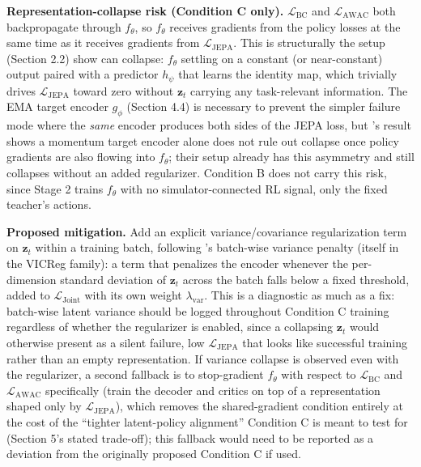 \documentclass[11pt]{article}
\begin{document}
\textbf{Representation-collapse risk (Condition C only).} \(\mathcal{L}_{\text{BC}}\) and \(\mathcal{L}_{\text{AWAC}}\) both backpropagate through \(f_\theta\), so \(f_\theta\) receives gradients from the policy losses at the same time as it receives gradients from \(\mathcal{L}_{\text{JEPA}}\). This is structurally the setup \citet{kenneweg2025jeparl} (Section 2.2) show can collapse: \(f_\theta\) settling on a constant (or near-constant) output paired with a predictor \(h_\psi\) that learns the identity map, which trivially drives \(\mathcal{L}_{\text{JEPA}}\) toward zero without \(\mathbf{z}_t\) carrying any task-relevant information. The EMA target encoder \(g_\phi\) (Section 4.4) is necessary to prevent the simpler failure mode where the \emph{same} encoder produces both sides of the JEPA loss, but \citeauthor{kenneweg2025jeparl}'s result shows a momentum target encoder alone does not rule out collapse once policy gradients are also flowing into \(f_\theta\); their setup already has this asymmetry and still collapses without an added regularizer. Condition B does not carry this risk, since Stage 2 trains \(f_\theta\) with no simulator-connected RL signal, only the fixed teacher's actions.

\textbf{Proposed mitigation.} Add an explicit variance/covariance regularization term on \(\mathbf{z}_t\) within a training batch, following \citeauthor{kenneweg2025jeparl}'s batch-wise variance penalty (itself in the VICReg family): a term that penalizes the encoder whenever the per-dimension standard deviation of \(\mathbf{z}_t\) across the batch falls below a fixed threshold, added to \(\mathcal{L}_{\text{Joint}}\) with its own weight \(\lambda_{\text{var}}\). This is a diagnostic as much as a fix: batch-wise latent variance should be logged throughout Condition C training regardless of whether the regularizer is enabled, since a collapsing \(\mathbf{z}_t\) would otherwise present as a silent failure, low \(\mathcal{L}_{\text{JEPA}}\) that looks like successful training rather than an empty representation. If variance collapse is observed even with the regularizer, a second fallback is to stop-gradient \(f_\theta\) with respect to \(\mathcal{L}_{\text{BC}}\) and \(\mathcal{L}_{\text{AWAC}}\) specifically (train the decoder and critics on top of a representation shaped only by \(\mathcal{L}_{\text{JEPA}}\)), which removes the shared-gradient condition entirely at the cost of the ``tighter latent-policy alignment'' Condition C is meant to test for (Section 5's stated trade-off); this fallback would need to be reported as a deviation from the originally proposed Condition C if used.
\end{document}
